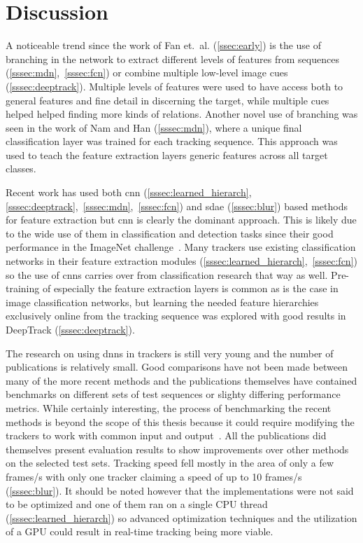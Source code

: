 
\section{Discussion}
A noticeable trend since the work of Fan et.~al. (\ref{ssec:early}) is the use of branching in the network to extract different levels of features from sequences (\ref{sssec:mdn},~\ref{sssec:fcn}) or combine multiple low-level image cues (\ref{sssec:deeptrack}). Multiple levels of features were used to have access both to general features and fine detail in discerning the target, while multiple cues helped helped finding more kinds of relations. Another novel use of branching was seen in the work of Nam and Han (\ref{sssec:mdn}), where a unique final classification layer was trained for each tracking sequence. This approach was used to teach the feature extraction layers generic features across all target classes.

Recent work has used both \ac{cnn} (\ref{sssec:learned_hierarch},\ref{sssec:deeptrack},~\ref{sssec:mdn},~\ref{sssec:fcn}) and \ac{sdae} (\ref{sssec:blur}) based methods for feature extraction but \ac{cnn} is clearly the dominant approach. This is likely due to the wide use of them in classification and detection tasks since their good performance in the ImageNet challenge~\cite{NIPS_IMAGENET}. Many trackers use existing classification networks in their feature extraction modules (\ref{sssec:learned_hierarch},~\ref{sssec:fcn}) so the use of \ac{cnn}s carries over from classification research that way as well. Pre-training of especially the feature extraction layers is common as is the case in image classification networks, but learning the needed feature hierarchies exclusively online from the tracking sequence was explored with good results in DeepTrack (\ref{sssec:deeptrack}).

The research on using \ac{dnn}s in trackers is still very young and the number of publications is relatively small. Good comparisons have not been made between many of the more recent methods and the publications themselves have contained benchmarks on different sets of test sequences or slighty differing performance metrics. While certainly interesting, the process of benchmarking the recent methods is beyond the scope of this thesis because it could require modifying the trackers to work with common input and output~\cite{OT_BENCH}. All the publications did themselves present evaluation results to show improvements over other methods on the selected test sets. Tracking speed fell mostly in the area of only a few frames/s with only one tracker claiming a speed of up to 10 frames/s (\ref{sssec:blur}). It should be noted however that the implementations were not said to be optimized and one of them ran on a single CPU thread (\ref{sssec:learned_hierarch}) so advanced optimization techniques and the utilization of a GPU could result in real-time tracking being more viable.

